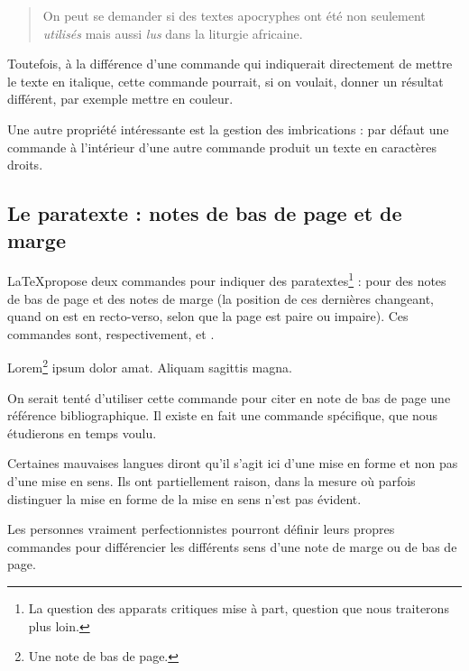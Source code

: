 \begin{quotation}
On peut se demander si des textes apocryphes 
ont été non seulement \emph{utilisés} mais aussi \emph{lus} dans la liturgie africaine.
\end{quotation}

Toutefois, à la différence d'une commande qui indiquerait directement de mettre le texte en italique, cette commande pourrait, si on voulait, donner un résultat différent, par exemple mettre en couleur. 

Une autre propriété intéressante est la gestion des imbrications : par défaut une commande  à l'intérieur d'une autre commande  produit un texte en caractères droits.

\subsection{Le paratexte : notes de bas de page et de marge}

\LaTeX propose deux commandes pour indiquer des paratextes\footnote{La question des apparats critiques mise à part, question que nous traiterons plus loin.} : pour des notes de bas de page et des notes de marge (la position de ces dernières changeant, quand on est en recto-verso, selon que la page est paire ou impaire). Ces commandes sont, respectivement,  et .

\begin{latexcode}
Lorem\footnote{Une note de bas de page.} ipsum dolor amat.
Aliquam sagittis magna.
\end{latexcode}

\begin{attention}
    On serait tenté d'utiliser cette commande pour citer en note de bas de page une référence bibliographique. Il existe en fait une commande spécifique, que nous étudierons en temps voulu.
\end{attention}
\begin{attention}
    Certaines mauvaises langues diront qu'il s'agit ici d'une mise en forme et non pas d'une mise en sens. Ils ont partiellement raison, dans la mesure où parfois distinguer la mise en forme de la mise en sens n'est pas évident.
    
    Les personnes vraiment perfectionnistes pourront définir leurs propres commandes pour différencier les différents sens d'une note de marge ou de bas de page.
\end{attention}

